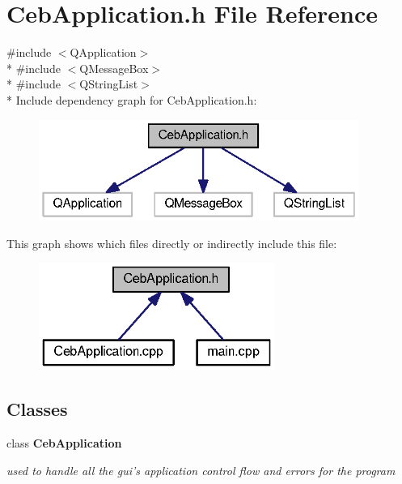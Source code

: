 \section{Ceb\-Application.\-h File Reference}
\label{_ceb_application_8h}
{\ttfamily \#include $<$Q\-Application$>$}\\*
{\ttfamily \#include $<$Q\-Message\-Box$>$}\\*
{\ttfamily \#include $<$Q\-String\-List$>$}\\*
Include dependency graph for Ceb\-Application.\-h\-:\nopagebreak
\begin{figure}[H]
\begin{center}
\leavevmode
\includegraphics[width=296pt]{_ceb_application_8h__incl}
\end{center}
\end{figure}
This graph shows which files directly or indirectly include this file\-:\nopagebreak
\begin{figure}[H]
\begin{center}
\leavevmode
\includegraphics[width=218pt]{_ceb_application_8h__dep__incl}
\end{center}
\end{figure}
\subsection*{Classes}
\begin{DoxyCompactItemize}
\item 
class {\bf Ceb\-Application}
\begin{DoxyCompactList}\small\item\em used to handle all the gui's application control flow and errors for the program \end{DoxyCompactList}\end{DoxyCompactItemize}
